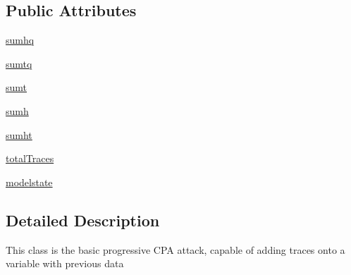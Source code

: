 \subsection*{Public Attributes}
\begin{DoxyCompactItemize}
\item 
\hyperlink{classsoftware_1_1chipwhisperer_1_1analyzer_1_1attacks_1_1cpa__algorithms_1_1progressive_1_1CPAProgressiveOneSubkey_a013ea5a2bd363d6d5aaf953e5dbee0dd}{sumhq}
\item 
\hyperlink{classsoftware_1_1chipwhisperer_1_1analyzer_1_1attacks_1_1cpa__algorithms_1_1progressive_1_1CPAProgressiveOneSubkey_a3f8f27352de8ef2c3dbebc1e3fb51954}{sumtq}
\item 
\hyperlink{classsoftware_1_1chipwhisperer_1_1analyzer_1_1attacks_1_1cpa__algorithms_1_1progressive_1_1CPAProgressiveOneSubkey_a061db56508f9340132d55ec9cf0a0ed0}{sumt}
\item 
\hyperlink{classsoftware_1_1chipwhisperer_1_1analyzer_1_1attacks_1_1cpa__algorithms_1_1progressive_1_1CPAProgressiveOneSubkey_aaf99598968c1ab0c7836bf3fdee9c309}{sumh}
\item 
\hyperlink{classsoftware_1_1chipwhisperer_1_1analyzer_1_1attacks_1_1cpa__algorithms_1_1progressive_1_1CPAProgressiveOneSubkey_abd38d5556813178f7c8b0b4f45bed94c}{sumht}
\item 
\hyperlink{classsoftware_1_1chipwhisperer_1_1analyzer_1_1attacks_1_1cpa__algorithms_1_1progressive_1_1CPAProgressiveOneSubkey_a07a202a4af63fed2b3d66043eca926b6}{total\+Traces}
\item 
\hyperlink{classsoftware_1_1chipwhisperer_1_1analyzer_1_1attacks_1_1cpa__algorithms_1_1progressive_1_1CPAProgressiveOneSubkey_a21ea6edb219d8380a85bd3d9a8c0abba}{modelstate}
\end{DoxyCompactItemize}


\subsection{Detailed Description}
\begin{DoxyVerb}This class is the basic progressive CPA attack, capable of adding traces onto a variable with previous data\end{DoxyVerb}
 

